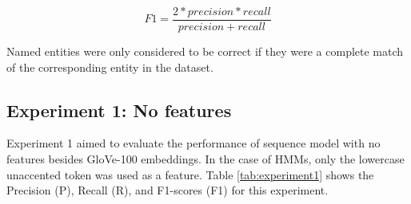 \documentclass{nle}
\begin{document}
\begin{equation}
F1 = \frac{2 * precision * recall}{precision + recall}
\end{equation}

Named entities were only considered to be correct if they were a complete match of the 
corresponding entity in the dataset. 

% 

\subsection{Experiment 1: No features}

Experiment 1 aimed to evaluate the performance of sequence model with no features
besides GloVe-100 embeddings. In the case of HMMs, only the lowercase
unaccented token was used as a feature. Table \ref{tab:experiment1} 
shows the Precision (P), Recall (R), and F1-scores (F1) for this
experiment.
\end{document}
